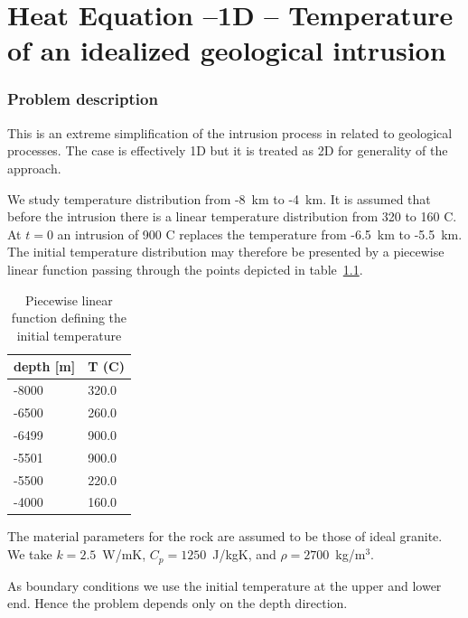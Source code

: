 \chapter{Heat Equation --1D -- Temperature of an idealized geological intrusion}



\subsection*{Problem description}

This is an extreme simplification of the intrusion process in 
related to geological processes. The case is effectively 1D but 
it is treated as 2D for generality of the approach. 

We study temperature distribution from -8~km to -4~km. It is assumed
that before the intrusion there is a linear temperature distribution
from 320 to 160 C. At $t=0$ an intrusion of 900 C replaces the 
temperature from -6.5~km to -5.5~km. The initial temperature distribution
may therefore be presented by a piecewise linear function passing through 
the points depicted in table~\ref{tb:inittemp}.

\begin{table}[h]
\caption{Piecewise linear function defining the initial temperature}
\label{tb:inittemp}
\begin{center}
\begin{tabular}{ll} \hline
depth [m] & T (C)    \\ \hline
-8000 & 320.0 \\
-6500 & 260.0 \\
-6499 & 900.0 \\
-5501 & 900.0 \\
-5500 & 220.0 \\
-4000 & 160.0 \\ \hline
\end{tabular}
\end{center}
\end{table}

The material parameters for the rock are assumed to be those of ideal granite. 
We take $k=2.5$~W/mK, $C_p=1250$~J/kgK, and $\rho=2700$~kg/m$^3$.

As boundary conditions we use the initial temperature at the upper and lower end. Hence the problem depends only on the depth direction.


